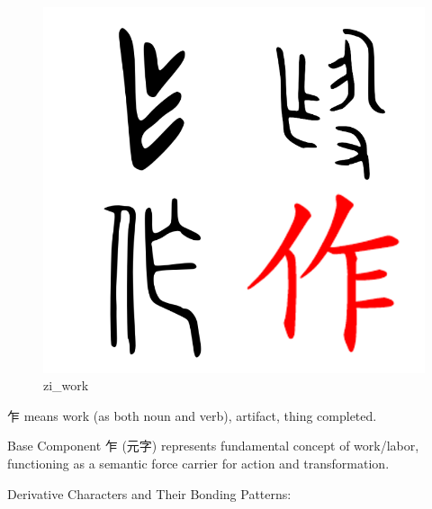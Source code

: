 \documentclass[
  11pt,
  letterpaper,
]{article}
\begin{document}
\begin{figure}
\centering
\includegraphics{./images/zi_work.png}
\caption{zi\_work}
\end{figure}

乍 means work (as both noun and verb), artifact, thing completed.

Base Component 乍 (元字) represents fundamental concept of work/labor,
functioning as a semantic force carrier for action and transformation.

Derivative Characters and Their Bonding Patterns:
\end{document}
